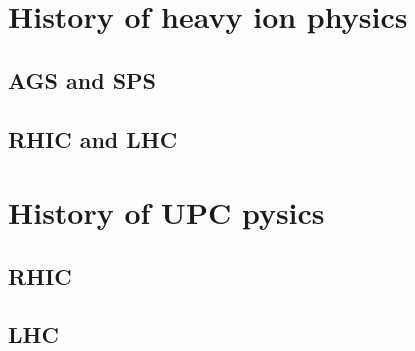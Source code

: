   \section{History of heavy ion physics}
    \subsection{AGS and SPS}
    \subsection{RHIC and LHC}

  \section{History of UPC pysics}
    \subsection{RHIC}
    \subsection{LHC}
